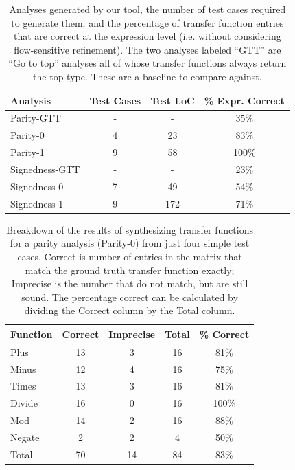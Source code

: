 \documentclass[10pt,conference]{IEEEtran}
\begin{document}
\begin{table}
\centering
 \begin{tabular}{l c c c }
  Analysis & Test Cases & Test LoC & \% Expr. Correct \\ 
  \midrule
  Parity-GTT & - & - & 35\% \\
  Parity-0 & 4 & 23 & 83\% \\
  Parity-1 & 9 & 58 & 100\% \\
  \midrule
  Signedness-GTT & - & - & 23\% \\
  Signedness-0 & 7 & 49 & 54\% \\
  Signedness-1 & 9 & 172 & 71\% \\
 \end{tabular}
 \caption{Analyses generated by our tool, the number of test cases
 required to generate them, and the percentage of transfer function
 entries that are correct at the expression level (i.e. without
 considering flow-sensitive refinement). The two analyses labeled
 ``GTT'' are ``Go to top'' analyses all of whose transfer functions
 always return the top type. These are a baseline to compare against.}
 \label{tab-analyses}
\end{table}

\begin{table}
\centering
 \begin{tabular}{l c c c c }
  
  Function & Correct & Imprecise & Total & \% Correct\\ 
  \midrule
  Plus & 13 & 3 & 16 & 81\% \\
  Minus & 12 & 4 & 16 & 75\% \\
  Times & 13 & 3 & 16 & 81\% \\
  Divide & 16 & 0 & 16 & 100\% \\
  Mod & 14 & 2 & 16 & 88\% \\
  Negate & 2 & 2 & 4 & 50\% \\
  \midrule
  Total & 70 & 14 & 84 & 83\% \\
 \end{tabular}
 \caption{Breakdown of the results of synthesizing transfer functions
 for a parity analysis (Parity-0)
 from just four simple test cases. Correct is number
 of entries in the matrix that match the ground truth transfer function
 exactly;
 Imprecise is the number that do not match, but are still sound. The
 percentage correct can be calculated by dividing
 the Correct column by the Total column.}
 \label{tab-Parity-0}
\end{table}
\end{document}
